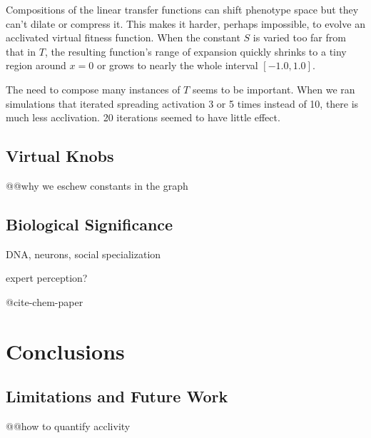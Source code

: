 \documentclass[letterpaper]{article}
\begin{document}
Compositions of the linear transfer functions can shift phenotype space but they
can't dilate or compress it. This makes it harder, perhaps impossible, to
evolve an acclivated virtual fitness function. When the constant $S$ is varied
too far from that in $T$, the resulting function's range of expansion quickly
shrinks to a tiny region around $x=0$ or grows to nearly the whole interval
$[-1.0, 1.0]$.

The need to compose many instances of $T$ seems to be important. When we ran
simulations that iterated spreading activation 3 or 5 times instead of 10,
there is much less acclivation. 20 iterations seemed to have little effect.

\subsection{Virtual Knobs}

@@why we eschew constants in the graph

\subsection{Biological Significance}

DNA, neurons, social specialization

expert perception?

@cite-chem-paper

\section{Conclusions}

\subsection{Limitations and Future Work}

@@how to quantify acclivity



\end{document}
